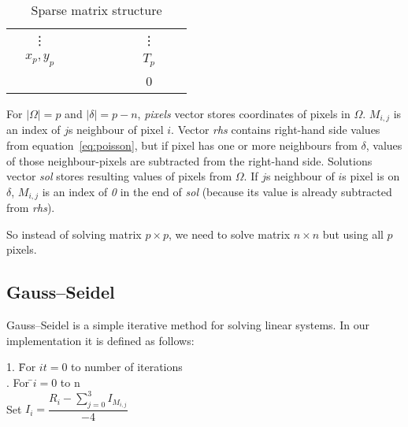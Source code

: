 \documentclass[hidelinks, english]{report}
\begin{document}
\begin{table*}[t]
\begin{tabular}{lclcccccccc}
            \multicolumn{1}{l|}{}                                 & \multicolumn{1}{c|}{\vdots}            & & & & & & \multicolumn{1}{c|}{} & \multicolumn{1}{c|}{\vdots}    & &                            \\ \cline{2-2} \cline{9-9}
            \multicolumn{1}{l|}{}                                 & \multicolumn{1}{c|}{$x_p,y_p$}         & & & & & & \multicolumn{1}{c|}{} & \multicolumn{1}{c|}{$T_p$}     & &                            \\ \cline{2-2} \cline{9-9}
            & & & & & & & \multicolumn{1}{c|}{} & \multicolumn{1}{c|}{0}         & &                            \\ \cline{9-9}
        \end{tabular}

        \caption{Sparse matrix structure}
        \label{tbl:sparse}
    \end{table*}

    For $ |\Omega| = p $ and $ |\delta| = p-n $, \textit{pixels} vector stores coordinates of pixels in $\Omega$. $M_{i,j}$
    is an index of $j$s neighbour of pixel $i$. Vector \textit{rhs} contains right-hand side values from
    equation~\eqref{eq:poisson}, but if pixel has one or more neighbours from $\delta$, values of those neighbour-pixels are
    subtracted from the right-hand side. Solutions vector \textit{sol} stores resulting values of pixels from $\Omega$. If
    $j$s neighbour of $i$s pixel is on $\delta$, $M_{i,j}$ is an index of \textit{0} in the end of \textit{sol} (because its
    value is already subtracted from \textit{rhs}).

    So instead of solving matrix $p \times p$, we need to solve matrix $n \times n$ but using all $p$ pixels.

    \subsection{Gauss–Seidel}
    Gauss–Seidel is a simple iterative method for solving linear systems. In our implementation it is defined as
    follows:

    \begin{tabbing}
        1. \=For $it=0$ to number of iterations\\
        . For \=$i=0$ to n $$\\
        \>\>Set
        \begin{math}
            I_i = \dfrac{R_i - \sum_{j=0}^3{I_{M_{i,j}}}}{-4}
        \end{math}
    \end{tabbing}
\end{document}
